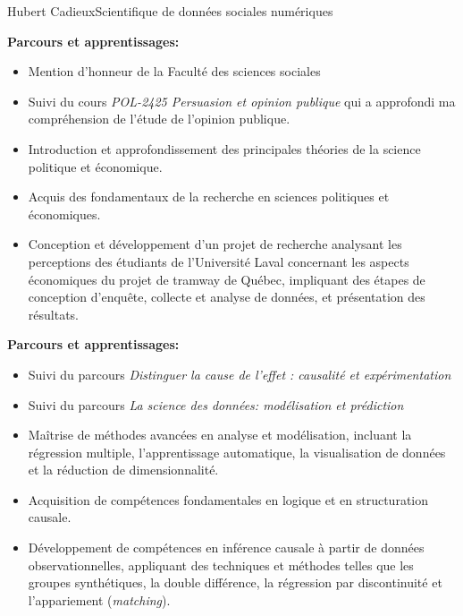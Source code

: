 \documentclass{article}
\begin{document}
\begin{cv}[avatar]{Hubert Cadieux}{Scientifique de données sociales numériques}
\begin{cvevent}[2020][2023]
    \textbf{Parcours et apprentissages:}
    \begin{itemize}
        \item Mention d'honneur de la Faculté des sciences sociales
        \item Suivi du cours \textit{POL-2425 Persuasion et opinion publique} qui a approfondi ma compréhension de l'étude de l'opinion publique.
        \item Introduction et approfondissement des principales théories de la science politique et économique.
        \item Acquis des fondamentaux de la recherche en sciences politiques et économiques.
        \item Conception et développement d'un projet de recherche analysant les perceptions des étudiants de l'Université Laval concernant les aspects économiques du projet de tramway de Québec, impliquant des étapes de conception d'enquête, collecte et analyse de données, et présentation des résultats.\\[10pt]
    \end{itemize}
\end{cvevent}

\begin{cvevent}[2022][2023]
    \textbf{Parcours et apprentissages:}
    \begin{itemize}
        \item Suivi du parcours \textit{Distinguer la cause de l'effet : causalité et expérimentation}
        \item Suivi du parcours \textit{La science des données: modélisation et prédiction}
        \item Maîtrise de méthodes avancées en analyse et modélisation, incluant la régression multiple, l'apprentissage automatique, la visualisation de données et la réduction de dimensionnalité.
        \item Acquisition de compétences fondamentales en logique et en structuration causale.
        \item Développement de compétences en inférence causale à partir de données observationnelles, appliquant des techniques et méthodes telles que les groupes synthétiques, la double différence, la régression par discontinuité et l'appariement (\textit{matching}).\\[10pt]
    \end{itemize}
\end{cvevent}


\end{cv}
\end{document}
